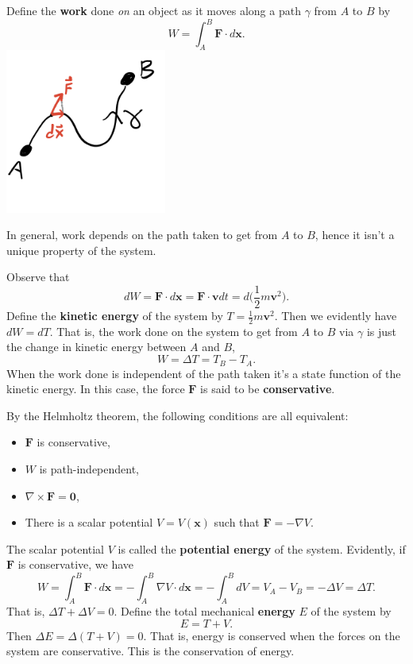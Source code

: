 \documentclass[
  letterpaper,
  DIV=11,
  numbers=noendperiod]{scrreprt}
\providecommand{\tightlist}{%
  \setlength{\itemsep}{0pt}\setlength{\parskip}{0pt}}\usepackage{longtable,booktabs,array}
\begin{document}
Define the \textbf{work} done \emph{on} an object as it moves along a
path \(\gamma\) from \(A\) to \(B\) by \[
W = \int_A^B \mathbf{F} \cdot d\mathbf{x}.
\]
\includegraphics[width=2.08333in,height=\textheight]{classical-mechanics/./resources/image-20230212032859080.png}

In general, work depends on the path taken to get from \(A\) to \(B\),
hence it isn't a unique property of the system.

Observe that \[
dW = \mathbf{F} \cdot d\mathbf{x} = \mathbf{F} \cdot \mathbf{v} dt = d\bigg(\frac{1}{2}m\mathbf{v}^2 \bigg).
\] Define the \textbf{kinetic energy} of the system by
\(T = \frac{1}{2} m \mathbf{v}^2\). Then we evidently have \(dW=dT\).
That is, the work done on the system to get from \(A\) to \(B\) via
\(\gamma\) is just the change in kinetic energy between \(A\) and \(B\),
\[
W = \Delta T = T_B - T_A.
\] When the work done is independent of the path taken it's a state
function of the kinetic energy. In this case, the force \(\mathbf{F}\)
is said to be \textbf{conservative}.

By the Helmholtz theorem, the following conditions are all equivalent:

\begin{itemize}
\tightlist
\item
  \(\mathbf{F}\) is conservative,
\item
  \(W\) is path-independent,
\item
  \(\nabla \times \mathbf{F} = \mathbf{0}\),
\item
  There is a scalar potential \(V=V(\mathbf{x})\) such that
  \(\mathbf{F} = -\nabla V\).
\end{itemize}

The scalar potential \(V\) is called the \textbf{potential energy} of
the system. Evidently, if \(\mathbf{F}\) is conservative, we have \[
W = \int_A^B \mathbf{F} \cdot d\mathbf{x} = -\int_A^B \nabla V \cdot d\mathbf{x} = -\int_A^B dV = V_A - V_B = -\Delta V = \Delta T.
\] That is, \(\Delta T + \Delta V = 0\). Define the total mechanical
\textbf{energy} \(E\) of the system by \[
E = T + V.
\] Then \(\Delta E = \Delta (T + V) = 0\). That is, energy is conserved
when the forces on the system are conservative. This is the conservation
of energy.
\end{document}
